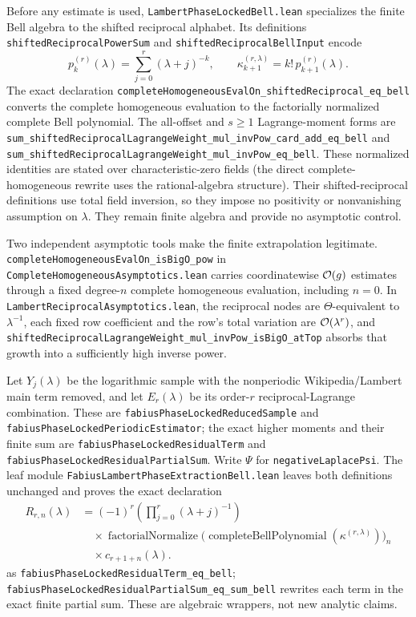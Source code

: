 \documentclass[11pt,oneside]{article}
\theoremstyle{definition}
\theoremstyle{remark}
\begin{document}
Before any estimate is used, \nolinkurl{LambertPhaseLockedBell.lean}
specializes the finite Bell algebra to the shifted reciprocal alphabet.  Its
definitions \nolinkurl{shiftedReciprocalPowerSum} and
\nolinkurl{shiftedReciprocalBellInput} encode
\[
 p_k^{(r)}(\lambda)=\sum_{j=0}^{r}(\lambda+j)^{-k},
 \qquad \kappa_{k+1}^{(r,\lambda)}=k!\,p_{k+1}^{(r)}(\lambda).
\]
The exact declaration
\nolinkurl{completeHomogeneousEvalOn_shiftedReciprocal_eq_bell} converts the
complete homogeneous evaluation to the factorially normalized complete Bell
polynomial.  The all-offset and \(s\ge1\) Lagrange-moment forms are
\nolinkurl{sum_shiftedReciprocalLagrangeWeight_mul_invPow_card_add_eq_bell}
and \nolinkurl{sum_shiftedReciprocalLagrangeWeight_mul_invPow_eq_bell}.
These normalized identities are stated over characteristic-zero fields (the
direct complete-homogeneous rewrite uses the rational-algebra structure).
Their shifted-reciprocal definitions use total field inversion, so they impose
no positivity or nonvanishing assumption on \(\lambda\).
They remain finite algebra and provide no asymptotic control.

Two independent asymptotic tools make the finite extrapolation legitimate.
\nolinkurl{completeHomogeneousEvalOn_isBigO_pow} in
\nolinkurl{CompleteHomogeneousAsymptotics.lean} carries coordinatewise
\(\mathcal{O}(g)\) estimates through a fixed degree-\(n\) complete homogeneous
evaluation, including \(n=0\).  In
\nolinkurl{LambertReciprocalAsymptotics.lean}, the reciprocal nodes are
\(\Theta\)-equivalent to \(\lambda^{-1}\), each fixed row coefficient and the
row's total variation are \(\mathcal{O}(\lambda^r)\), and
\nolinkurl{shiftedReciprocalLagrangeWeight_mul_invPow_isBigO_atTop}
absorbs that growth into a sufficiently high inverse power.

Let \(Y_j(\lambda)\) be the logarithmic sample with the nonperiodic
Wikipedia/Lambert main term removed, and let \(E_r(\lambda)\) be its
order-\(r\) reciprocal-Lagrange combination.  These are
\nolinkurl{fabiusPhaseLockedReducedSample} and
\nolinkurl{fabiusPhaseLockedPeriodicEstimator}; the exact higher moments and
their finite sum are \nolinkurl{fabiusPhaseLockedResidualTerm} and
\nolinkurl{fabiusPhaseLockedResidualPartialSum}.  Write \(\Psi\) for
\nolinkurl{negativeLaplacePsi}.  The leaf module
\nolinkurl{FabiusLambertPhaseExtractionBell.lean} leaves both definitions
unchanged and proves the exact declaration
\[
 \begin{aligned}
 R_{r,n}(\lambda)
   &=(-1)^r\left(\prod_{j=0}^{r}(\lambda+j)^{-1}\right) \\
   &\quad{}\times \operatorname{factorialNormalize}
     \bigl(\operatorname{completeBellPolynomial}
       (\kappa^{(r,\lambda)})\bigr)_n \\
   &\quad{}\times c_{r+1+n}(\lambda).
 \end{aligned}
\]
as \nolinkurl{fabiusPhaseLockedResidualTerm_eq_bell};
\nolinkurl{fabiusPhaseLockedResidualPartialSum_eq_sum_bell} rewrites each
term in the exact finite partial sum.  These are algebraic wrappers, not new
analytic claims.
\end{document}
